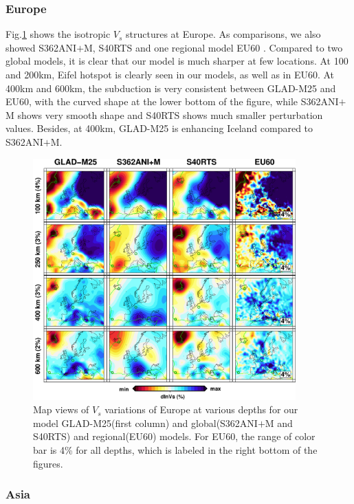 \documentclass[extra,mreferee]{gji}
\begin{document}
\subsubsection{Europe}


Fig.\ref{fig:europe-vs} shows the isotropic $V_s$ structures at Europe. As
comparisons, we also showed S362ANI$+$M, S40RTS and one regional model EU60
\citep{zhu2015seismic}. Compared to two global models, it is clear that
our model is much sharper at few locations. At 100 and 200km, Eifel
hotspot is clearly seen in our models, as well as in EU60. At 400km
and 600km, the subduction is very consistent between GLAD-M25 and EU60,
with the curved shape at the lower bottom of the figure,
while S362ANI$+$M shows very smooth shape and S40RTS shows much smaller 
perturbation values. Besides, at 400km, GLAD-M25 is enhancing Iceland
compared to S362ANI$+$M.

\begin{figure}
\includegraphics[width=0.9\textwidth]{figures/depth_slice/europe_vs.pdf}
  \caption{Map views of $V_s$ variations of Europe at various depths for our
  model GLAD-M25(first column) and global(S362ANI$+$M and S40RTS) and
  regional(EU60\citep{zhu2015seismic}) models. For EU60, the range of color
  bar is 4\% for all depths, which is labeled in the right bottom of the figures.}
\label{fig:europe-vs}
\centering
\end{figure}

\subsubsection{Asia}
\end{document}
